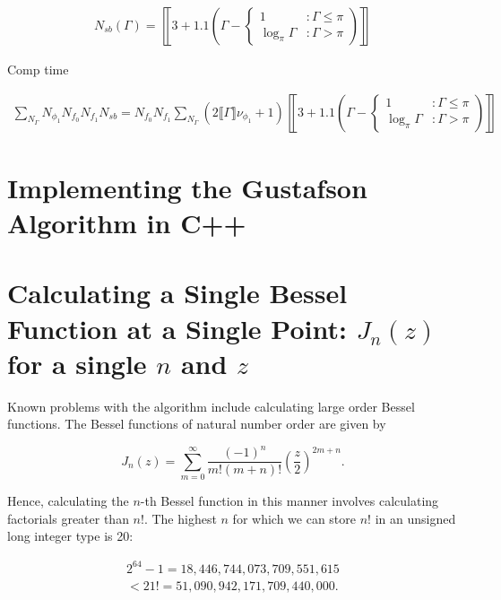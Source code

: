 \documentclass[onecolumn, groupedaddress, 10pt]{revtex4-1}
\begin{document}
\begin{align}
N_{sb} (\Gamma) 
= \left\llbracket
3 + 1.1 \left( \Gamma -
\left\{
     \begin{array}{lr}
       1               & : \Gamma \leq \pi    \\
       \log_\pi \Gamma & : \Gamma   >  \pi
     \end{array}
   \right.
   \right)
   \right\rrbracket
\end{align}

Comp time ~

\begin{align}
\sum_{N_\Gamma} N_{\phi_1} N_{f_0} N_{f_1} N_{sb}
=
N_{f_0} N_{f_1} \sum_{N_\Gamma} 
(2 \llbracket \Gamma \rrbracket \nu_{\phi_1} + 1)
\left\llbracket
3 + 1.1 \left( \Gamma -
\left\{
     \begin{array}{lr}
       1               & : \Gamma \leq \pi    \\
       \log_\pi \Gamma & : \Gamma   >  \pi
     \end{array}
   \right.
   \right)
   \right\rrbracket   
\end{align}

\section{Implementing the Gustafson Algorithm in C++}
\section{Calculating a Single Bessel Function at a Single Point: $J_n(z)$ for a single $n$ and $z$}
Known problems with the algorithm include calculating large order Bessel functions.  The Bessel functions of natural number order are given by

\begin{equation}
J_n(z) = \sum_{m=0}^{\infty} \frac{(-1)^n}{m!(m+n)!} \left( \frac{z}{2} \right)^{2m+n}.
\end{equation}

Hence, calculating the $n$-th Bessel function in this manner involves calculating factorials greater than $n!$.  The highest $n$ for which we can store $n!$ in an unsigned long integer type is 20:

\begin{align}
2^{64}-1 = 18,446,744,073,709,551,615 \\
< 21! = 51,090,942,171,709,440,000.
\end{align}
\end{document}
